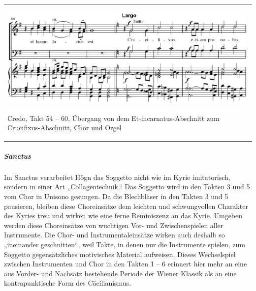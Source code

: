 \begin{center}
\tablefirsthead{}
\tablehead{}
\tabletail{}
\tablelasttail{}
\begin{supertabular}{m{13.070001cm}}

\includegraphics[width=12.887cm,height=4.953cm]{pictures/zulassungsarbeit-img120.png}
\begin{figure}
\img{}
\caption{}
\end{figure}
Credo, Takt 54 – 60, Übergang von dem
Et-incarnatus-Abschnitt zum Crucifixus-Abschnitt, Chor und Orgel

\\
\end{supertabular}
\end{center}
\subparagraph{Sanctus}
Im Sanctus verarbeitet Högn das Soggetto nicht wie im Kyrie
imitatorisch, sondern in einer Art „Collagentechnik.“ Das Soggetto wird
in den Takten 3 und 5 vom Chor in Unisono gesungen. Da die Blechbläser
in den Takten 3 und 5 pausieren, bleiben diese Choreinsätze dem
leichten und schwungvollen Charakter des Kyries treu und wirken wie
eine ferne Reminiszenz an das Kyrie. Umgeben werden diese Choreinsätze
von wuchtigen Vor- und Zwischenspielen aller Instrumente. Die Chor- und
Instrumentaleinsätze wirken auch deshalb so „ineinander geschnitten“,
weil Takte, in denen nur die Instrumente spielen, zum Soggetto
gegensätzliches motivisches Material aufweisen. Dieses Wechselspiel
zwischen Instrumenten und Chor in den Takten 1 – 6 erinnert hier mehr
an eine aus Vorder- und Nachsatz bestehende Periode der Wiener Klassik
als an eine kontrapunktische Form des Cäcilianismus.

